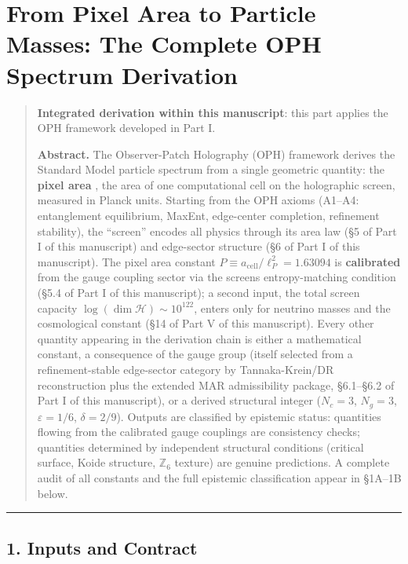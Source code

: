 \section{From Pixel Area to Particle Masses: The Complete OPH Spectrum Derivation}\label{from-pixel-area-to-particle-masses-the-complete-oph-spectrum-derivation}

\begin{quote}
\textbf{Integrated derivation within this manuscript}: this part applies the OPH framework developed in Part I.

\textbf{Abstract.} The Observer-Patch Holography (OPH) framework derives the Standard Model particle spectrum from a single geometric quantity: the \textbf{pixel area} , the area of one computational cell on the holographic screen, measured in Planck units. Starting from the OPH axioms (A1--A4: entanglement equilibrium, MaxEnt, edge-center completion, refinement stability), the ``screen'' encodes all physics through its area law (§5 of Part I of this manuscript) and edge-sector structure (§6 of Part I of this manuscript). The pixel area constant \(P \equiv a_{\text{cell}}/\ell_P^2 = 1.63094\) is \textbf{calibrated} from the gauge coupling sector via the screen\textquotesingle s entropy-matching condition (§5.4 of Part I of this manuscript); a second input, the total screen capacity \(\log(\dim\mathcal{H}) \sim 10^{122}\), enters only for neutrino masses and the cosmological constant (§14 of Part V of this manuscript). Every other quantity appearing in the derivation chain is either a mathematical constant, a consequence of the gauge group (itself selected from a refinement-stable edge-sector category by Tannaka-Krein/DR reconstruction plus the extended MAR admissibility package, §6.1--§6.2 of Part I of this manuscript), or a derived structural integer (\(N_c = 3\), \(N_g = 3\), \(\varepsilon = 1/6\), \(\delta = 2/9\)). Outputs are classified by epistemic status: quantities flowing from the calibrated gauge couplings are consistency checks; quantities determined by independent structural conditions (critical surface, Koide structure, \(\mathbb{Z}_6\) texture) are genuine predictions. A complete audit of all constants and the full epistemic classification appear in §1A--1B below.
\end{quote}

\begin{center}\rule{0.5\linewidth}{0.5pt}\end{center}

\subsection{1. Inputs and Contract}\label{1-inputs-and-contract}

